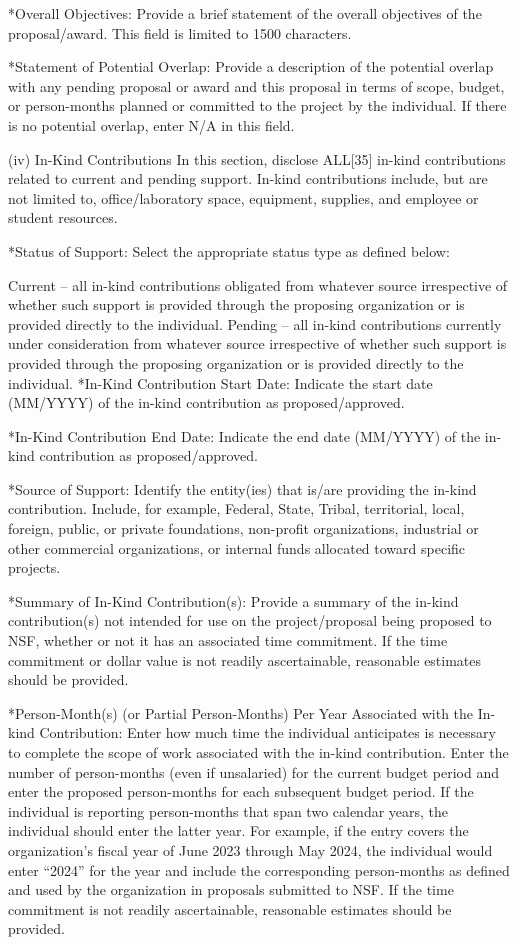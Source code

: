 {*Overall Objectives: Provide a brief statement of the overall objectives of the proposal/award. This field is limited to 1500 characters.

*Statement of Potential Overlap: Provide a description of the potential overlap with any pending proposal or award and this proposal in terms of scope, budget, or person-months planned or committed to the project by the individual. If there is no potential overlap, enter N/A in this field.

(iv) In-Kind Contributions
In this section, disclose ALL[35] in-kind contributions related to current and pending support. In-kind contributions include, but are not limited to, office/laboratory space, equipment, supplies, and employee or student resources.

*Status of Support: Select the appropriate status type as defined below:

Current – all in-kind contributions obligated from whatever source irrespective of whether such support is provided through the proposing organization or is provided directly to the individual.
Pending – all in-kind contributions currently under consideration from whatever source irrespective of whether such support is provided through the proposing organization or is provided directly to the individual.
*In-Kind Contribution Start Date: Indicate the start date (MM/YYYY) of the in-kind contribution as proposed/approved.

*In-Kind Contribution End Date: Indicate the end date (MM/YYYY) of the in-kind contribution as proposed/approved.

*Source of Support: Identify the entity(ies) that is/are providing the in-kind contribution. Include, for example, Federal, State, Tribal, territorial, local, foreign, public, or private foundations, non-profit organizations, industrial or other commercial organizations, or internal funds allocated toward specific projects.

*Summary of In-Kind Contribution(s): Provide a summary of the in-kind contribution(s) not intended for use on the project/proposal being proposed to NSF, whether or not it has an associated time commitment. If the time commitment or dollar value is not readily ascertainable, reasonable estimates should be provided.

*Person-Month(s) (or Partial Person-Months) Per Year Associated with the In-kind Contribution: Enter how much time the individual anticipates is necessary to complete the scope of work associated with the in-kind contribution. Enter the number of person-months (even if unsalaried) for the current budget period and enter the proposed person-months for each subsequent budget period. If the individual is reporting person-months that span two calendar years, the individual should enter the latter year. For example, if the entry covers the organization’s fiscal year of June 2023 through May 2024, the individual would enter “2024” for the year and include the corresponding person-months as defined and used by the organization in proposals submitted to NSF. If the time commitment is not readily ascertainable, reasonable estimates should be provided.

}
